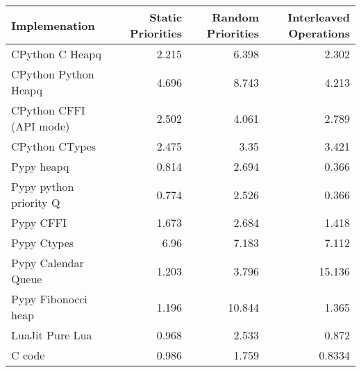 \documentclass[11pt]{article}
\begin{document}
\begin{center}
\begin{tabular}{lrrr}
Implemenation & Static Priorities & Random Priorities & Interleaved Operations\\
\hline
CPython C Heapq & 2.215 & 6.398 & 2.302\\
CPython Python Heapq & 4.696 & 8.743 & 4.213\\
CPython CFFI (API mode) & 2.502 & 4.061 & 2.789\\
CPython CTypes & 2.475 & 3.35 & 3.421\\
\hline
Pypy heapq & 0.814 & 2.694 & 0.366\\
Pypy python priority Q & 0.774 & 2.526 & 0.366\\
Pypy CFFI & 1.673 & 2.684 & 1.418\\
Pypy Ctypes & 6.96 & 7.183 & 7.112\\
Pypy Calendar Queue & 1.203 & 3.796 & 15.136\\
Pypy Fibonocci heap & 1.196 & 10.844 & 1.365\\
\hline
LuaJit Pure Lua & 0.968 & 2.533 & 0.872\\
C code & 0.986 & 1.759 & 0.8334\\
\end{tabular}
\end{center}
\end{document}
